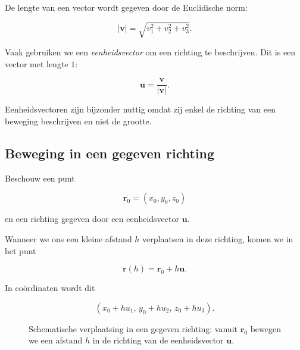 \documentclass[11pt,a4paper]{article}
\begin{document}
    De lengte van een vector wordt gegeven door de Euclidische norm:

    \[
        |\mathbf{v}| = \sqrt{v_1^2 + v_2^2 + v_3^2}.
    \]

    Vaak gebruiken we een \textit{eenheidsvector} om een richting te beschrijven.
    Dit is een vector met lengte $1$:

    \[
        \mathbf{u} = \frac{\mathbf{v}}{|\mathbf{v}|}.
    \]

    Eenheidsvectoren zijn bijzonder nuttig omdat zij enkel de richting
    van een beweging beschrijven en niet de grootte.

    \subsection{Beweging in een gegeven richting}

    Beschouw een punt

    \[
        \mathbf{r}_0 = (x_0, y_0, z_0)
    \]

    en een richting gegeven door een eenheidsvector $\mathbf{u}$.

    Wanneer we ons een kleine afstand $h$ verplaatsen in deze richting,
    komen we in het punt

    \[
        \mathbf{r}(h) = \mathbf{r}_0 + h\mathbf{u}.
    \]

    In coördinaten wordt dit

    \[
        (x_0 + hu_1,\, y_0 + hu_2,\, z_0 + hu_3).
    \]

    \begin{figure}[htbp]
        \centering
        \caption{Schematische verplaatsing in een gegeven richting: vanuit $\mathbf{r}_0$ bewegen we een afstand $h$ in de richting van de eenheidsvector $\mathbf{u}$.}
        \label{fig:richting-verplaatsing}
    \end{figure}
\end{document}
